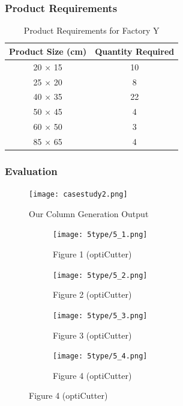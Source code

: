 \documentclass[a4paper]{article}
\begin{document}
\subsubsection*{Product Requirements}
\begin{table}[H]
    \centering
    \caption{Product Requirements for Factory Y}
    \begin{tabular}{|c|c|}
        \hline
        \textbf{Product Size (cm)} & \textbf{Quantity Required} \\ \hline
        20 × 15 & 10 \\ \hline
        25 × 20 & 8 \\ \hline
        40 × 35 & 22 \\ \hline
        50 × 45 & 4 \\ \hline
        60 × 50 & 3 \\ \hline
        85 × 65 & 4 \\ \hline
    \end{tabular}
\end{table}
\subsubsection*{Evaluation}
\begin{figure}[H]
    \centering
     \captionsetup{justification=centering, font=small} %
    \texttt{[image: casestudy2.png]}
    \vspace{0.4cm}
    \caption*{Our Column Generation Output}
     \label{fig:1}
\end{figure}
\begin{figure}[H] %
  \centering
  \captionsetup{justification=centering, font=small} %
  
  \begin{subfigure}[b]{0.48\textwidth}
    \centering
   \texttt{[image: 5type/5\_1.png]}
    \caption{Figure 1 (optiCutter)}
    \label{fig:1}
  \end{subfigure}
  \hfill
  \begin{subfigure}[b]{0.48\textwidth}
    \centering
    \texttt{[image: 5type/5\_2.png]}
    \caption{Figure 2 (optiCutter)}
    \label{fig:2}
  \end{subfigure}

  \vspace{0.1cm} %
  
  \begin{subfigure}[b]{0.48\textwidth}
    \centering
    \texttt{[image: 5type/5\_3.png]}
    \caption{Figure 3 (optiCutter) }
    \label{fig:3}
  \end{subfigure}
  \hfill
  \begin{subfigure}[b]{0.48\textwidth}
    \centering
    \texttt{[image: 5type/5\_4.png]}
    \caption{Figure 4 (optiCutter) }
    \label{fig:4}
  \end{subfigure}

  \label{fig:all_images_part1}
\end{figure}
\end{document}
